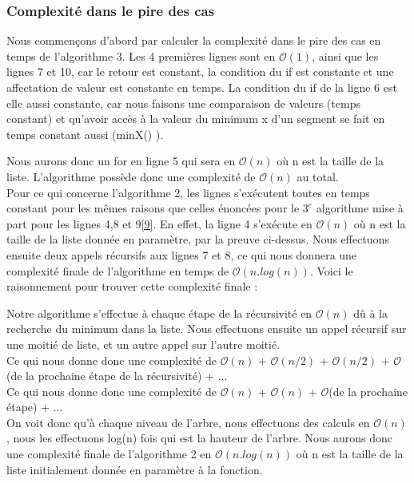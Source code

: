 \documentclass[10pt,a4paper]{article}
\begin{document}
\subsubsection{Complexité dans le pire des cas}
Nous commençons d'abord par calculer la complexité dans le pire des cas en temps de l'algorithme 3.
Les 4 premières lignes sont en $\mathcal{O} (1)$, ainsi que les lignes 7 et 10, car le retour est constant, la condition du if est constante et une affectation de valeur est constante en temps. La condition du if de la ligne 6 est elle aussi constante, car nous faisons une comparaison de valeurs (temps constant) et qu'avoir accès à la valeur du minimum x d'un segment se fait en temps constant aussi (minX() ).

Nous aurons donc un for en ligne 5 qui sera en $\mathcal{O}(n)$ où n est la taille de la liste.
L'algorithme possède donc une complexité de $\mathcal{O}(n)$ au total.
\\
Pour ce qui concerne l'algorithme 2, les lignes s'exécutent toutes en temps constant pour les mêmes raisons que celles énoncées pour le $3^e$ algorithme mise à part pour les lignes 4,8 et 9\ref{9}.
En effet, la ligne 4 s’exécute en $\mathcal{O}(n)$ où n est la taille de la liste donnée en paramètre, par la preuve ci-dessus. Nous effectuons ensuite deux appels récursifs aux lignes 7 et 8, ce qui nous donnera une complexité finale de l'algorithme en temps de $\mathcal{O}(n.log(n))$. Voici le raisonnement pour trouver cette complexité finale :

Notre algorithme s'effectue à chaque étape de la récursivité en $\mathcal{O}(n)$ dû à la recherche du minimum dans la liste. Nous effectuons ensuite un appel récursif sur une moitié de liste, et un autre appel sur l'autre moitié.\\ Ce qui nous donne donc une complexité de $\mathcal{O}(n)$ + $\mathcal{O}(n/2)$ + $\mathcal{O}(n/2)$ + $\mathcal{O}$(de la prochaine étape de la récursivité) + ...\\Ce qui nous donne donc une complexité de $\mathcal{O}(n)$ + $\mathcal{O}(n)$ + $\mathcal{O}$(de la prochaine étape) + ...\\ On voit donc qu'à chaque niveau de l'arbre, nous effectuons des calculs en $\mathcal{O}(n)$, nous les effectuons log(n) fois qui est la hauteur de l'arbre. Nous aurons donc une complexité finale de l’algorithme 2 en $\mathcal{O}(n.log(n))$ où n est la taille de la liste initialement donnée en paramètre à la fonction.
\\
\end{document}
